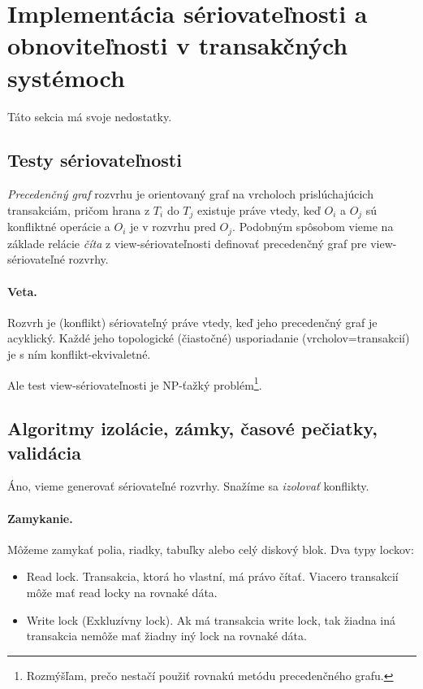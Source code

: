 \documentclass[10pt,a4paper]{article}
\begin{document}
\section{Implementácia sériovateľnosti a obnoviteľnosti v transakčných systémoch}
Táto sekcia má svoje nedostatky.

\subsection{Testy sériovateľnosti}
\label{test_seriovatelnosti}

\emph{Precedenčný graf} rozvrhu je orientovaný graf na vrcholoch prislúchajúcich transakciám,
pričom hrana z $T_i$ do $T_j$ existuje práve vtedy, keď $O_i$ a $O_j$ sú konfliktné operácie a $O_i$ je v rozvrhu pred $O_j$.
Podobným spôsobom vieme na základe relácie \emph{číta} z view-sériovateľnosti definovať precedenčný graf pre view-sériovateľné rozvrhy.

\paragraph{Veta.} Rozvrh je (konflikt) sériovateľný práve vtedy, keď jeho precedenčný graf je acyklický. Každé jeho topologické (čiastočné) usporiadanie (vrcholov=transakcií) je s ním konflikt-ekvivaletné.

Ale test view-sériovateľnosti je NP-ťažký problém\footnote{
Rozmýšľam, prečo nestačí použiť rovnakú metódu precedenčného grafu.
}.


\subsection{Algoritmy izolácie, zámky, časové pečiatky, validácia}

Áno, vieme generovať sériovateľné rozvrhy. Snažíme sa \emph{izolovať} konflikty.

\paragraph{Zamykanie.}
Môžeme zamykať polia, riadky, tabuľky alebo celý diskový blok. Dva typy lockov:
\begin{itemize}
\item Read lock. Transakcia, ktorá ho vlastní, má právo čítať. Viacero transakcií môže mať read locky na rovnaké dáta.
\item Write lock (Exkluzívny lock). Ak má transakcia write lock, tak žiadna iná transakcia nemôže mať žiadny iný lock na rovnaké dáta.
\end{itemize}
\end{document}
